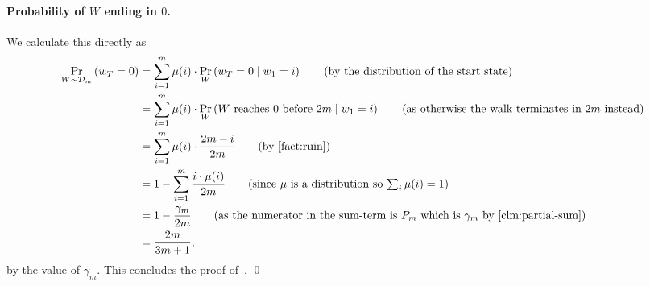 \paragraph{Probability of $W$ ending in $0$.} We calculate this directly as 
\begin{align*}
	\Pr_{W \sim \dist_m}\paren{w_T=0} &= \sum_{i=1}^{m} \mu(i) \cdot \Pr_{W}\paren{w_T=0 \mid w_1=i}	\tag{by the distribution of the start state} \\
	&= \sum_{i=1}^{m} \mu(i) \cdot \Pr_{W}\paren{\text{$W$ reaches $0$ before $2m$} \mid w_1=i} \tag{as otherwise the walk terminates in $2m$ instead} \\
	&= \sum_{i=1}^{m} \mu(i) \cdot \frac{2m-i}{2m} \tag{by~\Cref{fact:ruin}} \\
	&= 1- \sum_{i=1}^{m} \frac{i \cdot \mu(i)}{2m} \tag{since $\mu$ is a distribution so $\sum_i \mu(i)=1$} \\
	&= 1- \frac{\gamma_m}{2m} \tag{as the numerator in the sum-term is $P_m$ which is $\gamma_m$ by~\Cref{clm:partial-sum}} \\
	&= \frac{2m}{3m+1},
\end{align*}
by the value of $\gamma_m$. This concludes the proof of~. \qed

